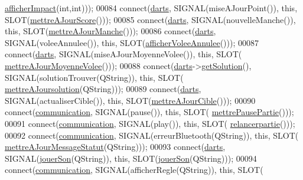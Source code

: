 \begin{DoxyCode}
      \hyperlink{class_ihm_a591e686d87b027ac16e91b3b9867a58a}{afficherImpact}(\textcolor{keywordtype}{int},\textcolor{keywordtype}{int})));
00084     connect(\hyperlink{class_ihm_a2a0f54d33f4d6b2531ec2190c4a2356e}{darts}, SIGNAL(miseAJourPoint()), \textcolor{keyword}{this}, SLOT(\hyperlink{class_ihm_a238255f517506367fe8913b2dad50c65}{mettreAJourScore}()));
00085     connect(\hyperlink{class_ihm_a2a0f54d33f4d6b2531ec2190c4a2356e}{darts}, SIGNAL(nouvelleManche()), \textcolor{keyword}{this}, SLOT(\hyperlink{class_ihm_a3b41d92919b87966f903b22863dc6acb}{mettreAJourManche}()));
00086     connect(\hyperlink{class_ihm_a2a0f54d33f4d6b2531ec2190c4a2356e}{darts}, SIGNAL(voleeAnnulee()), \textcolor{keyword}{this}, SLOT(\hyperlink{class_ihm_a066192d0a1b9c241a67032b0c3c96be6}{afficherVoleeAnnulee}()));
00087     connect(\hyperlink{class_ihm_a2a0f54d33f4d6b2531ec2190c4a2356e}{darts}, SIGNAL(miseAJourMoyenneVolee()), \textcolor{keyword}{this}, SLOT(
      \hyperlink{class_ihm_abafc4398a910be8ab95a75fbdf176426}{mettreAJourMoyenneVolee}()));
00088     connect(\hyperlink{class_ihm_a2a0f54d33f4d6b2531ec2190c4a2356e}{darts}->\hyperlink{class_darts_a2e41c247a12dfd3065c77c2484fc5532}{getSolution}(), SIGNAL(solutionTrouver(QString)), \textcolor{keyword}{this}, SLOT(
      \hyperlink{class_ihm_a27b24d133887431399b4696a4eae02e6}{mettreAJoursolution}(QString)));
00089     connect(\hyperlink{class_ihm_a2a0f54d33f4d6b2531ec2190c4a2356e}{darts}, SIGNAL(actualiserCible()), \textcolor{keyword}{this}, SLOT(\hyperlink{class_ihm_a3c504c417aa2d3efd82ac5feded16895}{mettreAJourCible}()));
00090     connect(\hyperlink{class_ihm_a2f3d4781795781a840786cd8c2233899}{communication}, SIGNAL(pause()), \textcolor{keyword}{this}, SLOT(
      \hyperlink{class_ihm_ab8456da276715f99ba373b71313592de}{mettrePausePartie}()));
00091     connect(\hyperlink{class_ihm_a2f3d4781795781a840786cd8c2233899}{communication}, SIGNAL(play()), \textcolor{keyword}{this}, SLOT(
      \hyperlink{class_ihm_a3480957ba23548b30dddc717f6cfa577}{relancerpartie}()));
00092     connect(\hyperlink{class_ihm_a2f3d4781795781a840786cd8c2233899}{communication}, SIGNAL(erreurBluetooth(QString)), \textcolor{keyword}{this}, SLOT(
      \hyperlink{class_ihm_ab80e655c95fca8e1113343bdbd3d3586}{mettreAJourMessageStatut}(QString)));
00093     connect(\hyperlink{class_ihm_a2a0f54d33f4d6b2531ec2190c4a2356e}{darts}, SIGNAL(\hyperlink{class_ihm_a55f2d106f7af9ed2e84f78822e23bb97}{jouerSon}(QString)), \textcolor{keyword}{this}, SLOT(\hyperlink{class_ihm_a55f2d106f7af9ed2e84f78822e23bb97}{jouerSon}(QString)));
00094     connect(\hyperlink{class_ihm_a2f3d4781795781a840786cd8c2233899}{communication}, SIGNAL(afficherRegle(QString)), \textcolor{keyword}{this}, SLOT(

\end{DoxyCode}
